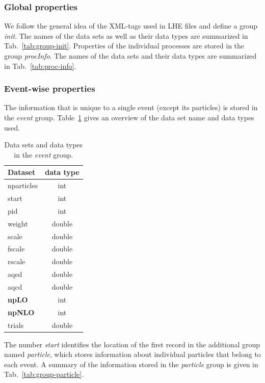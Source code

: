 \documentclass[aps,prd,twocolumn,fleqn,superscriptaddress,groupedaddress,nofootinbib,preprintnumbers]{revtex4}
\begin{document}
\subsubsection{Global properties}
We follow the general idea of the XML-tags used in LHE files and define
a group {\it{init}}. The names of the data sets as well as their data types
are summarized in Tab.~\ref{tab:group-init}. Properties of the individual
processes are stored in the group {\it procInfo}. The names of the data sets
and their data types are summarized in Tab.~\ref{tab:proc-info}.

\subsubsection{Event-wise properties}
The information that is unique to a single event (except its particles)
is stored in the {\it event} group. Table~\ref{tab:group-event} gives
an overview of the data set name and data types used.

\begin{table}[t]
    \centering
    \begin{tabular}{lc}
        Dataset & data type \\ \toprule
        {\sc nparticles}  & int    \\
        {\sc start}          & int \\
        {\sc pid}         & int    \\
        {\sc weight}      & double \\
        {\sc scale}       & double \\
        {\sc fscale}       & double \\
        {\sc rscale}      & double \\
        {\sc aqed}        & double \\
        {\sc aqcd}       & double \\ \bottomrule
        {\bf{\sc npLO}}       & int \\
        {\bf{\sc npNLO}}      & int \\
        {\sc trials}          & double
    \end{tabular}
    \caption{\label{tab:group-event} Data sets and data types in the {\it event} group.}
\end{table}

The number {\it start} identifies the location
of the first record in the additional group named {\it particle},
which stores information about individual particles that belong to
each event. A summary of the information stored in the {\it particle}
group is given in Tab.~\ref{tab:group-particle}.
\end{document}
